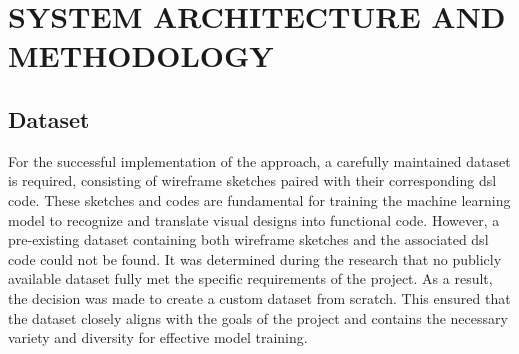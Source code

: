    
\section{\MakeUppercase{System Architecture and Methodology}}
\subsection{Dataset}
For the successful implementation of the approach, a carefully maintained dataset is required, consisting of wireframe sketches paired with their corresponding \gls{dsl} code. These sketches and codes are fundamental for training the machine learning model to recognize and translate visual designs into functional code. However, a pre-existing dataset containing both wireframe sketches and the associated \gls{dsl} code could not be found. It was determined during the research that no publicly available dataset fully met the specific requirements of the project. As a result, the decision was made to create a custom dataset from scratch. This ensured that the dataset closely aligns with the goals of the project and contains the necessary variety and diversity for effective model training.

